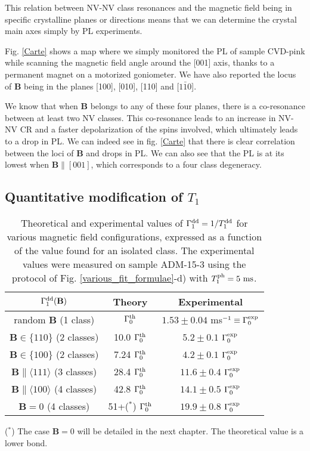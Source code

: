 \documentclass[a4paper,11pt]{report}
\begin{document}
This relation between NV-NV class resonances and the magnetic field being in specific crystalline planes or directions means that we can determine the crystal main axes simply by PL experiments.

Fig. \ref{Carte} shows a map where we simply monitored the PL of sample CVD-pink while scanning the magnetic field angle around the [001] axis, thanks to a permanent magnet on a motorized goniometer. We have also reported the locus of $\mathbf{B}$ being in the planes [100], [010], [110] and [$1\bar 1 0$].

We know that when $\mathbf{B}$ belongs to any of these four planes, there is a co-resonance between at least two NV classes. This co-resonance leads to an increase in NV-NV CR and a faster depolarization of the spins involved, which ultimately leads to a drop in PL. We can indeed see in fig. \ref{Carte} that there is clear correlation between the loci of $\mathbf{B}$ and drops in PL. We can also see that the PL is at its lowest when $\mathbf{B}\parallel [001]$, which corresponds to a four class degeneracy.

\subsection{Quantitative modification of $T_1$}
\label{sec quantitative T1}
\begin{table}[htbp]
\centering
\caption{Theoretical and experimental values of $\Gamma_1^{\rm dd}=1/T_1^{\rm dd}$ for various magnetic field configurations, expressed as a function of the value found for an isolated class. The experimental values were measured on sample ADM-15-3 using the protocol of Fig. \ref{various_fit_formulae}-d) with $T_1^{\rm ph}= 5\ \rm ms$.}
 \label{T1 champ mag}
\begin{tabular}{c|cc}
\toprule
$\Gamma_1^{\rm dd} (\mathbf{B})$ &  Theory & Experimental \\
\midrule
random $\mathbf{B}$ (1 class) & $\Gamma_0^{\rm th}$ & $1.53\pm 0.04$ ms$^{-1} \equiv \Gamma_0^{\rm exp}$ \\
$\mathbf{B} \in \{110\}$ (2 classes) & 10.0 $\Gamma_0^{\rm th}$ & $5.2 \pm 0.1$ $\Gamma_0^{\rm exp}$ \\
$\mathbf{B} \in \{100\}$ (2 classes) & 7.24 $\Gamma_0^{\rm th}$ & $4.2 \pm 0.1$ $\Gamma_0^{\rm exp}$ \\
$\mathbf{B} \parallel \langle 111 \rangle$ (3 classes) & 28.4 $\Gamma_0^{\rm th}$ & $11.6 \pm 0.4$ $\Gamma_0^{\rm exp}$ \\
$\mathbf{B} \parallel \langle 100 \rangle$ (4 classes) & 42.8 $\Gamma_0^{\rm th}$ & $14.1 \pm 0.5$ $\Gamma_0^{\rm exp}$ \\
$\mathbf{B}=0$ (4 classes) & 51+($^*$) $\Gamma_0^{\rm th}$ & $19.9 \pm 0.8$ $\Gamma_0^{\rm exp}$ \\
\bottomrule
\end{tabular}

($^*$) The case $\mathbf{B}=0$ will be detailed in the next chapter. The theoretical value is a lower bond.
\end{table}
\end{document}
